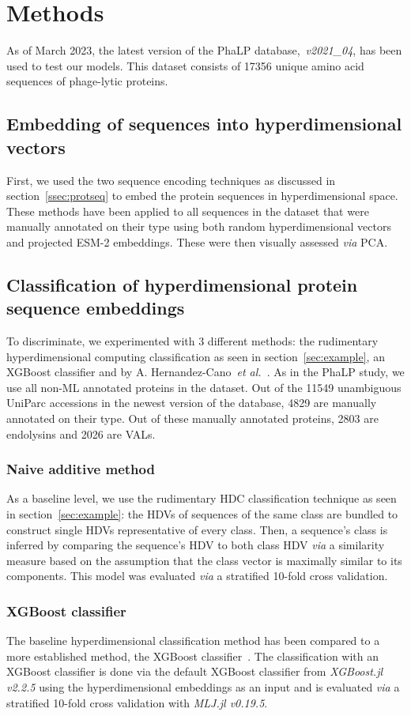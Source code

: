 \section{Methods}
As of March 2023, the latest version of the PhaLP database,~\textit{v2021\_04}, has been used to test our models. This dataset consists of 17356 unique amino acid sequences of phage-lytic proteins.
\subsection*{Embedding of sequences into hyperdimensional vectors}
First, we used the two sequence encoding techniques as discussed in section~\ref{ssec:protseq} to embed the protein sequences in hyperdimensional space. These methods have been applied to all sequences in the dataset that were manually annotated on their type using both random hyperdimensional vectors and projected ESM-2 embeddings. These were then visually assessed \textit{via} PCA.

\subsection*{Classification of hyperdimensional protein sequence embeddings}
To discriminate, we experimented with 3 different methods: the rudimentary hyperdimensional computing classification as seen in section~\ref{sec:example}, an XGBoost classifier and  by A. Hernandez-Cano~\textit{et al.}~\cite{onlinehd}. As in the PhaLP study, we use all non-ML annotated proteins in the dataset. Out of the 11549 unambiguous UniParc accessions in the newest version of the database, 4829 are manually annotated on their type. Out of these manually annotated proteins, 2803 are endolysins and 2026 are VALs.
\subsubsection*{Naive additive method}
As a baseline level, we use the rudimentary HDC classification technique as seen in section~\ref{sec:example}: the HDVs of sequences of the same class are bundled to construct single HDVs representative of every class. Then, a sequence's class is inferred by comparing the sequence's HDV to both class HDV \textit{via} a similarity measure based on the assumption that the class vector is maximally similar to its components. This model was evaluated \textit{via} a stratified 10-fold cross validation.
\subsubsection*{XGBoost classifier}
The baseline hyperdimensional classification method has been compared to a more established method, the XGBoost classifier~\cite{xgboost}. The classification with an XGBoost classifier is done via the default XGBoost classifier from \textit{XGBoost.jl v2.2.5} using the hyperdimensional embeddings as an input and is evaluated \textit{via} a stratified 10-fold cross validation with \textit{MLJ.jl v0.19.5}.
